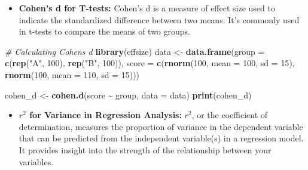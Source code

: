 \documentclass[
]{book}
\newenvironment{Shaded}{\begin{snugshade}}{\end{snugshade}}
\newcommand{\AttributeTok}[1]{\textcolor[rgb]{0.13,0.29,0.53}{#1}}
\newcommand{\CommentTok}[1]{\textcolor[rgb]{0.56,0.35,0.01}{\textit{#1}}}
\newcommand{\DecValTok}[1]{\textcolor[rgb]{0.00,0.00,0.81}{#1}}
\newcommand{\FunctionTok}[1]{\textcolor[rgb]{0.13,0.29,0.53}{\textbf{#1}}}
\newcommand{\NormalTok}[1]{#1}
\newcommand{\OtherTok}[1]{\textcolor[rgb]{0.56,0.35,0.01}{#1}}
\newcommand{\SpecialCharTok}[1]{\textcolor[rgb]{0.81,0.36,0.00}{\textbf{#1}}}
\newcommand{\StringTok}[1]{\textcolor[rgb]{0.31,0.60,0.02}{#1}}
\providecommand{\tightlist}{%
  \setlength{\itemsep}{0pt}\setlength{\parskip}{0pt}}
\begin{document}
\begin{itemize}
\tightlist
\item
  \textbf{Cohen's d for T-tests:} Cohen's d is a measure of effect size used to indicate the standardized difference between two means. It's commonly used in t-tests to compare the means of two groups.
\end{itemize}

\begin{Shaded}
\begin{Highlighting}[]
\CommentTok{\# Calculating Cohen\textquotesingle{}s d}
\FunctionTok{library}\NormalTok{(effsize)}
\NormalTok{data }\OtherTok{\textless{}{-}} \FunctionTok{data.frame}\NormalTok{(}\AttributeTok{group =} \FunctionTok{c}\NormalTok{(}\FunctionTok{rep}\NormalTok{(}\StringTok{"A"}\NormalTok{, }\DecValTok{100}\NormalTok{), }\FunctionTok{rep}\NormalTok{(}\StringTok{"B"}\NormalTok{, }\DecValTok{100}\NormalTok{)),}
                   \AttributeTok{score =} \FunctionTok{c}\NormalTok{(}\FunctionTok{rnorm}\NormalTok{(}\DecValTok{100}\NormalTok{, }\AttributeTok{mean =} \DecValTok{100}\NormalTok{, }\AttributeTok{sd =} \DecValTok{15}\NormalTok{),}
                             \FunctionTok{rnorm}\NormalTok{(}\DecValTok{100}\NormalTok{, }\AttributeTok{mean =} \DecValTok{110}\NormalTok{, }\AttributeTok{sd =} \DecValTok{15}\NormalTok{)))}

\NormalTok{cohen\_d }\OtherTok{\textless{}{-}} \FunctionTok{cohen.d}\NormalTok{(score }\SpecialCharTok{\textasciitilde{}}\NormalTok{ group, }\AttributeTok{data =}\NormalTok{ data)}
\FunctionTok{print}\NormalTok{(cohen\_d)}
\end{Highlighting}
\end{Shaded}

\begin{itemize}
\tightlist
\item
  \textbf{\(r^2\) for Variance in Regression Analysis:} \(r^2\), or the coefficient of determination, measures the proportion of variance in the dependent variable that can be predicted from the independent variable(s) in a regression model. It provides insight into the strength of the relationship between your variables.
\end{itemize}

\begin{Shaded}
\end{Shaded}
\end{document}
